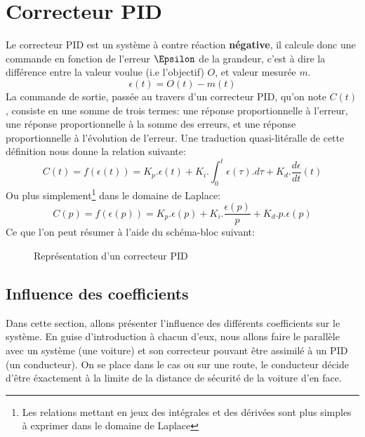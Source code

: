    \section{Correcteur PID}
        Le correcteur PID est un système à contre réaction \textbf{négative}, il calcule donc une commande en fonction de l'erreur $\Epsilon$ de la grandeur, c'est à dire la différence entre la valeur voulue (i.e l'objectif) $O$, et valeur mesurée $m$.
        \begin{equation}
            \epsilon (t) = O(t) - m(t)
        \end{equation}
        La commande de sortie, passée au travers d'un correcteur PID, qu'on note $C(t)$, consiste en une somme de trois termes: une réponse proportionnelle à l'erreur, une réponse proportionnelle à la somme des erreurs, et une réponse proportionnelle à l'évolution de l'erreur. Une traduction quasi-litéralle de cette définition nous donne la relation suivante:
        \begin{equation}
            C(t) = f(\epsilon(t)) = K_p . \epsilon(t) + K_i . \int_{0}^{t}\epsilon(\tau).d\tau + K_d . \frac{d\epsilon}{dt}(t)
        \end{equation}
        Ou plus simplement\footnote{Les relations mettant en jeux des intégrales et des dérivées sont plus simples à exprimer dans le domaine de Laplace} dans le domaine de Laplace:
        \begin{equation}
            C(p) = f(\epsilon(p)) = K_p . \epsilon(p) + K_i . \frac{\epsilon(p)}{p} + K_d.p.\epsilon(p)
        \end{equation}
        Ce que l'on peut résumer à l'aide du schéma-bloc suivant:
        \begin{figure}[h]
            \centering
            
            \caption{Représentation d'un correcteur PID}
        \end{figure}

        \newpage
        \subsection{Influence des coefficients}
            Dans cette section, allons présenter l'influence des différents coefficients sur le système. En guise d'introduction à chacun d'eux, nous allons faire le parallèle avec un système (une voiture) et son correcteur pouvant être assimilé à un PID (un conducteur). On se place dans le cas ou sur une route, le conducteur décide d'être éxactement à la limite de la distance de sécurité de la voiture d'en face.

